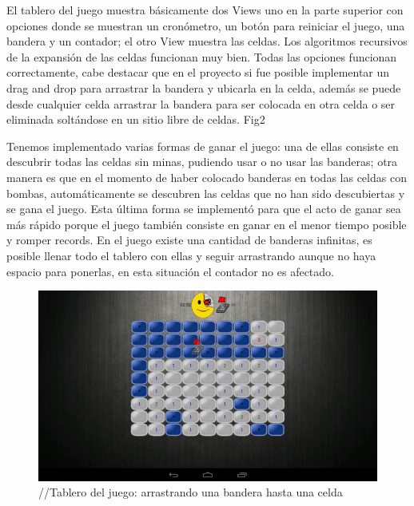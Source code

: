 \documentclass[11pt]{article} %
\begin{document}
El tablero del juego muestra básicamente dos Views uno en la parte superior con opciones donde se muestran un cronómetro, un botón para reiniciar el juego, una bandera y un contador; el otro View muestra las celdas.  Los algoritmos recursivos de la expansión de las celdas funcionan muy bien. Todas las opciones  funcionan correctamente, cabe destacar que en el proyecto si fue posible implementar un drag and drop para arrastrar la bandera y ubicarla en la celda, además se puede desde cualquier celda arrastrar la bandera para ser colocada en otra celda o ser eliminada soltándose en un sitio libre de celdas. Fig2

Tenemos implementado varias formas de ganar el juego: una de ellas consiste en descubrir todas las celdas sin minas, pudiendo usar o no usar las banderas; otra manera es que en el momento de haber colocado banderas en todas las celdas con bombas, automáticamente se descubren las celdas que no han sido descubiertas y se gana el juego. Esta última forma se implementó para que el acto de ganar sea más rápido porque el juego también consiste en ganar en el menor tiempo posible y romper records. En el juego existe una cantidad de banderas infinitas, es posible llenar todo el tablero con ellas y seguir arrastrando aunque no haya espacio para ponerlas, en esta situación el contador no es afectado.

\begin{figure}[H]
 \begin{center}
    \includegraphics{imagenes_Documentacion/fig2}
\end{center}
\caption {//Tablero del juego: arrastrando una bandera hasta una celda}
\label{Figura 2}
\end{figure}
\end{document}
